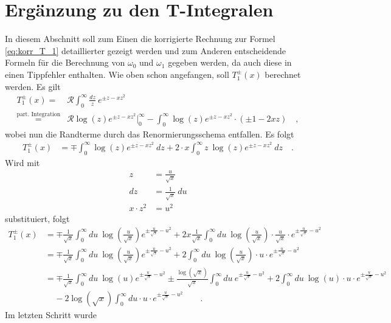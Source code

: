 \chapter{Ergänzung zu den T-Integralen}
\label{sec:AnhangB:T_Integral}
In diesem Abschnitt soll zum Einen die korrigierte Rechnung 
zur Formel \ref{eq:korr_T_1} detaillierter gezeigt werden und 
zum Anderen entscheidende Formeln für die Berechnung von 
$\omega_0$ und $\omega_1$ gegeben werden, da auch diese in 
\cite{av:1a2} einen Tippfehler enthalten. Wie oben schon 
angefangen, soll $T_1^\pm(x)$ berechnet werden. Es gilt 
\begin{align*}
T_1^\pm (x)=& \mathcal{R}\int_{0}^{\infty} \frac{dz}{z} \ 
e^{\pm z - xz^2}\\
\overset{\text{part. Integration}}{=}& 
\mathcal{R}\log(z)e^{\pm 
z-xz^2}|_0^\infty - \int_{0}^{\infty}\log(z)e^{\pm z-xz^2} 
\cdot (\pm 1-2xz) \quad,
\end{align*}
wobei nun die Randterme durch das Renormierungsschema 
entfallen. Es folgt 
\begin{align*}
T_1^\pm(x) &= \mp \int_{0}^{\infty}\log(z)e^{\pm z-xz^2}\ dz 
+ 2\cdot x\int_{0}^{\infty} z\ \log(z)e^{\pm z-xz^2} \ dz 
\quad.
\end{align*}
Wird mit 
\begin{align*}
z&=\frac{u}{\sqrt{x}}\\
dz&=\frac{1}{\sqrt{x}} \ du \\
x\cdot z^2&=u^2
\end{align*} 
substituiert, folgt
\begin{align*}
T_1^\pm(x)&=\mp \frac{1}{\sqrt{x}}\int_{0}^{\infty}du\ 
\log(\frac{u}{\sqrt{x}}) e^{\pm\frac{u}{\sqrt{x}}-u^2 }+ 
2x\frac{1}{\sqrt{x}}\int_{0}^{\infty}du\ 
\log(\frac{u}{\sqrt{x}})\cdot \frac{u}{\sqrt{x}}\cdot 
e^{\pm\frac{u}{\sqrt{x}}-u^2 }\\
&=\mp \frac{1}{\sqrt{x}}\int_{0}^{\infty}du\ 
\log(\frac{u}{\sqrt{x}}) e^{\pm\frac{u}{\sqrt{x}}-u^2 }+ 
2\int_{0}^{\infty}du\ \log(\frac{u}{\sqrt{x}})\cdot u\cdot 
e^{\pm\frac{u}{\sqrt{x}}-u^2 }\\
&=\mp \frac{1}{\sqrt{x}}\int_{0}^{\infty}du\ \log(u) 
e^{\pm\frac{u}{\sqrt{x}}-u^2 }
\pm  \frac{\log(\sqrt{x})}{\sqrt{x}}\int_{0}^{\infty}du\ 
e^{\pm\frac{u}{\sqrt{x}}-u^2 }
+ 2\int_{0}^{\infty}du\ \log(u)\cdot u\cdot 
e^{\pm\frac{u}{\sqrt{x}}-u^2 }\\
&\ \ \ \ \ -2 \log(\sqrt{x})\int_{0}^{\infty}du\cdot u\cdot 
e^{\pm\frac{u}{\sqrt{x}}-u^2 }\qquad.
\end{align*}
Im letzten Schritt wurde 
